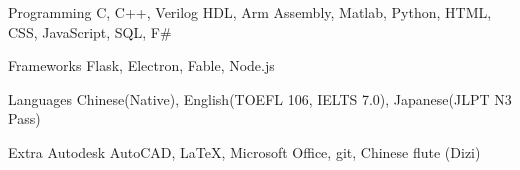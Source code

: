 
\begin{cvskills}
  \cvskill
    {Programming} %
    {C, C++, Verilog HDL, Arm Assembly, Matlab, Python, HTML, CSS, JavaScript, SQL, F\#} %

  \cvskill
    {Frameworks} %
    {Flask, Electron, Fable, Node.js} %
    
  \cvskill
    {Languages}
    {Chinese(Native), English(TOEFL 106, IELTS 7.0), Japanese(JLPT N3 Pass)}
    
  \cvskill
    {Extra} %
    {Autodesk AutoCAD, LaTeX, Microsoft Office, git, Chinese flute (Dizi)} %
\end{cvskills}
